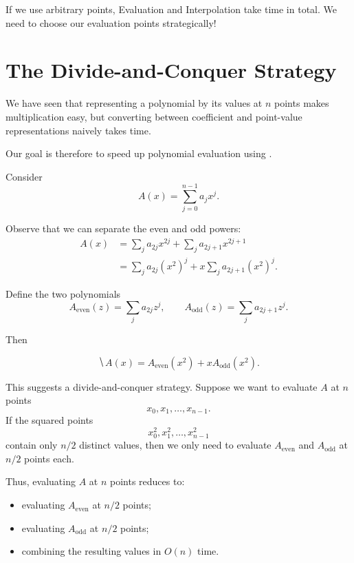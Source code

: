 \documentclass[11  pt]{article}
\begin{document}
\vs{1cm}
\noindent
If we use arbitrary points, Evaluation and Interpolation take  time in total. We need to choose our evaluation points strategically!

\newpage
\section{The Divide-and-Conquer Strategy}
We have seen that representing a polynomial by its values at $n$ points makes multiplication easy, but converting between coefficient and point-value representations naively takes  time.

\vs{1cm}

Our goal is therefore to speed up polynomial evaluation using .

\vs{1cm}

Consider
\[A(x) = \sum_{j=0}^{n-1} a_j x^j.\]

\vs{2cm}

Observe that we can separate the even and odd powers:
\begin{align*}
A(x)
&= \sum_j a_{2j}x^{2j} + \sum_j a_{2j+1}x^{2j+1} \\
&= \sum_j a_{2j}(x^2)^j
   + x\sum_j a_{2j+1}(x^2)^j.
\end{align*}

\vs{2cm}

Define the two polynomials
\[
A_{\mathrm{even}}(z) = \sum_j a_{2j}z^j,
\qquad
A_{\mathrm{odd}}(z) = \sum_j a_{2j+1}z^j.
\]

\vs{2cm}

Then

\vs{1cm}

\[\hide{
\boxed{
A(x) = A_{\mathrm{even}}(x^2)
      + xA_{\mathrm{odd}}(x^2).
}}
\]

\newpage
This suggests a divide-and-conquer strategy. Suppose we want to
evaluate $A$ at $n$ points
\[
x_0,x_1,\ldots,x_{n-1}.
\]
If the squared points
\[
x_0^2,x_1^2,\ldots,x_{n-1}^2
\]
contain only $n/2$ distinct values, then we only need to evaluate
$A_{\mathrm{even}}$ and $A_{\mathrm{odd}}$ at $n/2$ points each.

Thus, evaluating $A$ at $n$ points reduces to:
\begin{itemize}
    \item evaluating $A_{\mathrm{even}}$ at $n/2$ points;
    \item evaluating $A_{\mathrm{odd}}$ at $n/2$ points;
    \item combining the resulting values in $O(n)$ time.
\end{itemize}
\end{document}
